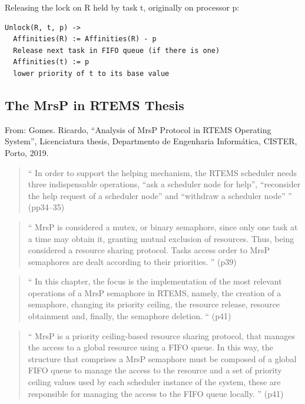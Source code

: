Releasing the lock on R held by task t, originally on processor p:
\begin{verbatim}
Unlock(R, t, p) ->
  Affinities(R) := Affinities(R) - p
  Release next task in FIFO queue (if there is one)
  Affinities(t) := p
  lower priority of t to its base value
\end{verbatim}


\subsection{The MrsP in RTEMS Thesis}

From:
Gomes. Ricardo,
``Analysis of MrsP Protocol in RTEMS Operating System'',
Licenciatura thesis,
Departmento de Engenharia Inform\'{a}tica, CISTER, Porto,
2019.

\begin{quotation}
``
In order to support the helping mechanism,
the RTEMS scheduler needs three indispensable operations,
“ask a scheduler node for help”,
“reconsider the help request of a scheduler node”
and “withdraw a scheduler node”
'' (pp34--35)
\end{quotation}

\begin{quotation}
``
MrsP is considered a mutex,
or binary semaphore,
since only one task at a time may obtain it,
granting mutual exclusion of resources.
Thus, being considered a resource sharing protocol.
Tasks access order to MrsP semaphores are dealt according to their priorities.
'' (p39)
\end{quotation}

\begin{quotation}
``
In this chapter,
the focus is the implementation of the most relevant operations
of a MrsP semaphore in RTEMS,
namely,
the creation of a semaphore,
changing its priority ceiling,
the resource release,
resource obtainment and,
finally,
the semaphore deletion.
`` (p41)
\end{quotation}

\begin{quotation}
``
MrsP is a priority ceiling-based resource sharing protocol,
that manages the access to a global resource using a FIFO queue.
In this way,
the structure that comprises a MrsP semaphore
must be composed of a global FIFO queue
to manage the access to the resource
and a set of priority ceiling values
used by each scheduler instance of the system,
these are responsible for managing the access to the FIFO queue locally.
'' (p41)
\end{quotation}


